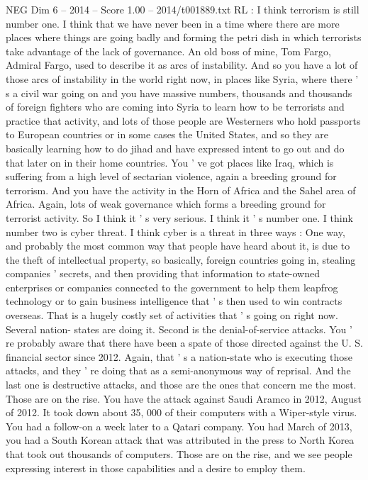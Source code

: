 \begin{textsample}{NEG Dim 6 – 2014 – Score 1.00 – 2014/t001889.txt}
RL : I think terrorism is still number one.
I think that we have never been in a time where there are more places where things are going badly and forming the petri dish in which terrorists take advantage of the lack of governance.
An old boss of mine, Tom Fargo, Admiral Fargo, used to describe it as arcs of instability.
And so you have a lot of those arcs of instability in the world right now, in places like Syria, where there ' s a civil war going on and you have massive numbers, thousands and thousands of foreign fighters who are coming into Syria to learn how to be terrorists and practice that activity, and lots of those people are Westerners who hold passports to European countries or in some cases the United States, and so they are basically learning how to do jihad and have expressed intent to go out and do that later on in their home countries.
You ' ve got places like Iraq, which is suffering from a high level of sectarian violence, again a breeding ground for terrorism.
And you have the activity in the Horn of Africa and the Sahel area of Africa.
Again, lots of weak governance which forms a breeding ground for terrorist activity.
So I think it ' s very serious.
I think it ' s number one.
I think number two is cyber threat.
I think cyber is a threat in three ways : One way, and probably the most common way that people have heard about it, is due to the theft of intellectual property, so basically, foreign countries going in, stealing companies ' secrets, and then providing that information to state-owned enterprises or companies connected to the government to help them leapfrog technology or to gain business intelligence that ' s then used to win contracts overseas.
That is a hugely costly set of activities that ' s going on right now.
Several nation- states are doing it.
Second is the denial-of-service attacks.
You ' re probably aware that there have been a spate of those directed against the U.
S. financial sector since 2012.
Again, that ' s a nation-state who is executing those attacks, and they ' re doing that as a semi-anonymous way of reprisal.
And the last one is destructive attacks, and those are the ones that concern me the most.
Those are on the rise.
You have the attack against Saudi Aramco in 2012, August of 2012.
It took down about 35, 000 of their computers with a Wiper-style virus.
You had a follow-on a week later to a Qatari company.
You had March of 2013, you had a South Korean attack that was attributed in the press to North Korea that took out thousands of computers.
Those are on the rise, and we see people expressing interest in those capabilities and a desire to employ them.

\end{textsample}
